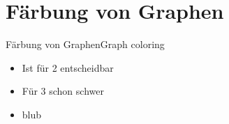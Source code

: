 \section{Färbung von Graphen}
\begin{frame}{Färbung von Graphen}{Graph coloring}
	\begin{itemize}
		\item Ist für 2 entscheidbar
		\item Für 3 schon schwer
		\item blub
	\end{itemize}
\end{frame}
